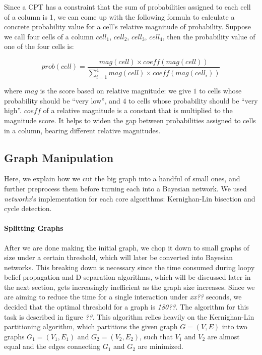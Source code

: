 Since a CPT has a constraint that the sum of probabilities assigned to each cell
of a column is 1, we can come up with the following formula to calculate a
concrete probability value for a cell's relative magnitude of probability.
Suppose we call four cells of a column $cell_1$, $cell_2$, $cell_3$, $cell_4$,
then the probability value of one of the four cells is:

\begin{equation*}
  prob(cell) = \frac{mag(cell)\times coeff(mag(cell))}{\sum_{i=1}^{4}mag(cell)\times coeff(mag(cell_i))}
\end{equation*}

where $mag$ is the score based on relative magnitude: we give $1$ to cells whose
probability should be ``very low'', and $4$ to cells whose probability should be
``very high''. $coeff$ of a relative magnitude is a constant that is multiplied
to the magnitude score. It helps to widen the gap between probabilities assigned
to cells in a column, bearing different relative magnitudes.

\subsection{Graph Manipulation}

Here, we explain how we cut the big graph into a handful of small ones, and
further preprocess them before turning each into a Bayesian network. We used
\emph{networkx}'s implementation for each core algorithms: Kernighan-Lin
bisection and cycle detection.

\paragraph{Splitting Graphs}

After we are done making the initial graph, we chop it down to small graphs of
size under a certain threshold, which will later be converted into Bayesian
networks. This breaking down is necessary since the time consumed during loopy
belief propagation and D-separation algorithms, which will be discussed later
in the next section, gets increasingly inefficient as the graph size increases. Since we are aiming
to reduce the time for a single interaction under \emph{xx??} seconds, we
decided that the optimal threshold for a graph is \emph{180??}. The algorithm
for this task is described in figure \emph{??}. This algorithm relies heavily on
the Kernighan-Lin partitioning algorithm, %
which partitions the given graph $G=(V, E)$ into two graphs $G_1=(V_1,E_1)$ and
$G_2=(V_2, E_2)$, such that $V_1$ and $V_2$ are almost equal and the edges
connecting $G_1$ and $G_2$ are minimized. %

